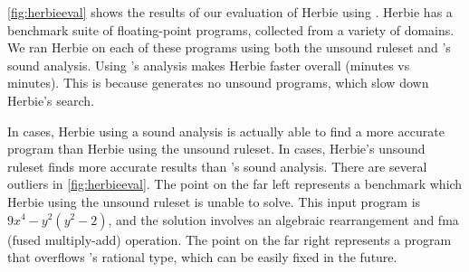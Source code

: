 \autoref{fig:herbieeval} shows the results
 of our evaluation of Herbie using \egglog.
Herbie has a benchmark suite of \numtests floating-point programs,
 collected from a variety of domains.
We ran Herbie on each of these programs
 using both the unsound ruleset and \egglog's sound analysis.
Using \egglog's analysis makes Herbie faster overall
  (\timeegglogminutes minutes vs \timevanillaminutes minutes).
This is because \egglog generates no unsound programs, which slow down
  Herbie's search.

In \numbettererror cases,
 Herbie using a sound analysis is actually able
 to find a more accurate program than Herbie
 using the unsound ruleset.
In \numworseerror cases,
 Herbie's unsound ruleset finds more accurate results
 than \egglog's sound analysis.
There are several outliers in \autoref{fig:herbieeval}.
The point on the far left represents a benchmark
  which Herbie using the unsound ruleset is unable to solve.
This input program is $9x^4 - y^2(y^2-2)$,
  and the solution involves an algebraic rearrangement
  and fma (fused multiply-add) operation.
The point on the far right represents a program that
  overflows \egglog's rational type, which can be easily fixed in the future.
